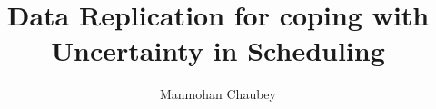 \documentclass[12pt]{article}
\theoremstyle{mystyle}
\begin{document}
%
%

\startprelim

\author{Manmohan Chaubey}
\title{Data Replication for coping with Uncertainty in Scheduling}









\maketitlepage

\makecopyright
\end{document}
